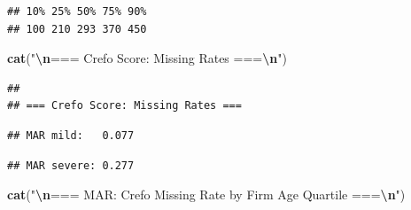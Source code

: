 \documentclass[
]{article}
\newenvironment{Shaded}{\begin{snugshade}}{\end{snugshade}}
\newcommand{\DecValTok}[1]{\textcolor[rgb]{0.00,0.00,0.81}{#1}}
\newcommand{\FunctionTok}[1]{\textcolor[rgb]{0.13,0.29,0.53}{\textbf{#1}}}
\newcommand{\NormalTok}[1]{#1}
\newcommand{\SpecialCharTok}[1]{\textcolor[rgb]{0.81,0.36,0.00}{\textbf{#1}}}
\newcommand{\StringTok}[1]{\textcolor[rgb]{0.31,0.60,0.02}{#1}}
\begin{document}
\begin{verbatim}
## 10% 25% 50% 75% 90% 
## 100 210 293 370 450
\end{verbatim}

\begin{Shaded}
\begin{Highlighting}[]
\FunctionTok{cat}\NormalTok{(}\StringTok{"}\SpecialCharTok{\textbackslash{}n}\StringTok{=== Crefo Score: Missing Rates ===}\SpecialCharTok{\textbackslash{}n}\StringTok{"}\NormalTok{)}
\end{Highlighting}
\end{Shaded}

\begin{verbatim}
## 
## === Crefo Score: Missing Rates ===
\end{verbatim}

\begin{Shaded}
\end{Shaded}

\begin{verbatim}
## MAR mild:   0.077
\end{verbatim}

\begin{Shaded}
\end{Shaded}

\begin{verbatim}
## MAR severe: 0.277
\end{verbatim}

\begin{Shaded}
\begin{Highlighting}[]
\FunctionTok{cat}\NormalTok{(}\StringTok{"}\SpecialCharTok{\textbackslash{}n}\StringTok{=== MAR: Crefo Missing Rate by Firm Age Quartile ===}\SpecialCharTok{\textbackslash{}n}\StringTok{"}\NormalTok{)}
\end{Highlighting}
\end{Shaded}
\end{document}
